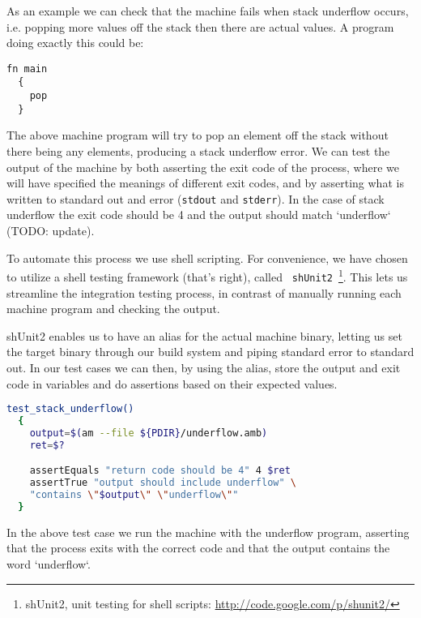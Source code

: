 As an example we can check that the machine fails when stack underflow occurs,
i.e. popping more values off the stack then there are actual values. A program
doing exactly this could be:
\begin{lstlisting}[language={bytecode},caption={Machine program producing
    stack underflow}]
  fn main
  {
    pop
  }
\end{lstlisting}

The above machine program will try to pop an element off the stack without there
being any elements, producing a stack underflow error. We can test the output of
the machine by both asserting the exit code of the process, where we will have
specified the meanings of different exit codes, and by asserting what is written
to standard out and error ({\tt stdout} and {\tt stderr}). In the case of stack
underflow the exit code should be 4 and the output should match `underflow`
(TODO: update).

To automate this process we use shell scripting. For convenience, we have chosen
to utilize a shell testing framework (that's right), called {\tt
  shUnit2}~\footnote{shUnit2, unit testing for shell scripts:
  \url{http://code.google.com/p/shunit2/}}. This lets us streamline the
integration testing process, in contrast of manually running each machine
program and checking the output.

shUnit2 enables us to have an alias for the actual machine binary, letting us
set the target binary through our build system and piping standard error to
standard out. In our test cases we can then, by using the alias, store the
output and exit code in variables and do assertions based on their expected
values.
\begin{lstlisting}[language={sh},caption={shUnit2 underflow test case}]
  test_stack_underflow()
  {
    output=$(am --file ${PDIR}/underflow.amb)
    ret=$?

    assertEquals "return code should be 4" 4 $ret
    assertTrue "output should include underflow" \
    "contains \"$output\" \"underflow\""
  }
\end{lstlisting}

In the above test case we run the machine with the underflow program, asserting
that the process exits with the correct code and that the output contains the
word `underflow`.
